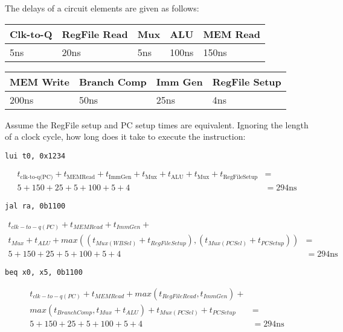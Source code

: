 \begin{blocksection}
The delays of a circuit elements are given as follows:

\begin{tabular}{ |l|l|l|l|l| } 
	\hline
	Clk-to-Q & RegFile Read & Mux & ALU & MEM Read \\ 
	\hline
	5ns & 20ns & 5ns & 100ns & 150ns \\ 
	\hline
\end{tabular}

\begin{tabular}{ |l|l|l|l| } 
	\hline
	MEM Write & Branch Comp & Imm Gen & RegFile Setup \\ 
	\hline
	200ns & 50ns & 25ns & 4ns \\ 
	\hline
\end{tabular}

\question
Assume the RegFile setup and PC setup times are equivalent. Ignoring the length of a clock cycle, how long does it take to execute the instruction:

\begin{parts}

	\item
	\lstinline$lui t0, 0x1234$
	\begin{solution}[0.8in]
		\begin{align*}
		t_{\text{clk-to-q(PC)}} + t_{\text{MEMRead}} + t_{\text{ImmGen}} + t_{\text{Mux}} + t_{\text{ALU}} + t_{\text{Mux}} + t_{\text{RegFileSetup}} &=\\
		5 + 150 + 25 + 5 + 100 + 5 + 4 &= 294\text{ns}
		\end{align*}
	\end{solution}

	\item
	\lstinline$jal ra, 0b1100$
	\begin{solution}[0.8in]
		\begin{align*}
		t_{clk-to-q(PC)} + t_{MEMRead} + t_{ImmGen} +\\
		 t_{Mux} + t_{ALU} + max((t_{Mux(WBSel)} + t_{RegFileSetup}), (t_{Mux(PCSel)} + t_{PC Setup})) &=\\
		5 + 150 + 25 + 5 + 100 + 5 + 4 &= 294\text{ns}
		\end{align*}
	\end{solution}


	\item
	\lstinline$beq x0, x5, 0b1100$
	\begin{solution}[0.8in]
		\begin{align*}
		t_{clk-to-q(PC)} + t_{MEMRead} + max(t_{RegFileRead}, t_{ImmGen}) +\\
		 max(t_{BranchComp}, t_{Mux} + t_{ALU}) + t_{Mux(PCSel)} + t_{PC Setup} &=\\
		5 + 150 + 25 + 5 + 100 + 5 + 4 &= 294\text{ns}
		\end{align*}
	\end{solution}

\end{parts}
\end{blocksection}
